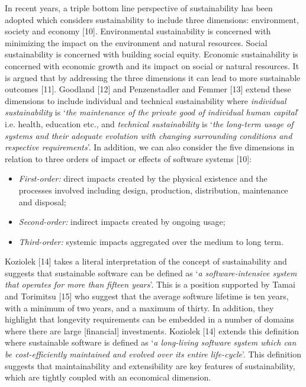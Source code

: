 \documentclass[preprint,12pt,authoryear]{elsarticle}
\begin{document}
In recent years, a triple bottom line perspective of sustainability
has been adopted which considers sustainability to include three
dimensions: environment, society and economy [10]. Environmental
sustainability is concerned with minimizing the impact on the
environment and natural resources. Social sustainability is concerned
with building social equity. Economic sustainability is concerned with
economic growth and its impact on social or natural resources. It is
argued that by addressing the three dimensions it can lead to more
sustainable outcomes [11]. Goodland [12] and Penzenstadler and Femmer
[13] extend these dimensions to include individual and technical
sustainability where {\emph{individual sustainability}} is `{\emph{the
maintenance of the private good of individual human capital}}'
i.e. health, education etc., and {\emph{technical sustainability}} is
`{\emph{the long-term usage of systems and their adequate evolution
with changing surrounding conditions and respective
requirements}}'. In addition, we can also consider the five dimensions
in relation to three orders of impact or effects of software systems
[10]:

\begin{itemize}
\item {\emph{First-order:}} direct impacts created by the physical
existence and the processes involved including design, production,
distribution, maintenance and disposal;
\item {\emph{Second-order:}} indirect impacts created by ongoing
usage;
\item {\emph{Third-order:}} systemic impacts aggregated over the
medium to long term.
\end{itemize}

Koziolek [14] takes a literal interpretation of the concept of
sustainability and suggests that sustainable software can be defined
as `{\emph{a software-intensive system that operates for more than
fifteen years}}'. This is a position supported by Tamai and Torimitsu
[15] who suggest that the average software lifetime is ten years, with
a minimum of two years, and a maximum of thirty. In addition, they
highlight that longevity requirements can be embedded in a number of
domains where there are large [financial] investments. Koziolek [14]
extends this definition where sustainable software is defined as
`{\emph{a long-living software system which can be cost-efficiently
maintained and evolved over its entire life-cycle}}'. This definition
suggests that maintainability and extensibility are key features of
sustainability, which are tightly coupled with an economical
dimension.
\end{document}
